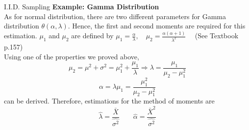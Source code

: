 \documentclass[12pt]{article}
\begin{document}
\begin{section}{I.I.D. Sampling}
\textbf{Example: Gamma Distribution}\\
As for normal distribution, there are two different parameters for Gamma distribution $\theta (\alpha,\lambda)$. Hence, the first and second moments are required for this estimation. $\mu_1$ and $\mu_2$ are defined by $\mu_1 = \frac{\alpha}{\lambda}, \quad \mu_2 = \frac{\alpha(\alpha + 1)}{\lambda^2} \quad$ (See Textbook p.157)\\ 

Using one of the properties we proved above, $$\mu_2 = \mu^2 + \sigma^2 = \mu_1^2 + \frac{\mu_1}{\lambda} \Rightarrow \lambda = \frac{\mu_1}{\mu_2-\mu_1^2}$$ 
$$\alpha = \lambda \mu_1 = \frac{\mu_1^2}{\mu_2-\mu_1^2}$$can be derived. Therefore, estimations for the method of moments are 
$$\hat{\lambda} = \frac{\bar{X}}{\hat{\sigma^2}} \qquad \hat{\alpha} = \frac{\bar{X}^2}{\hat{\sigma^2}}$$









\end{section}
\end{document}
